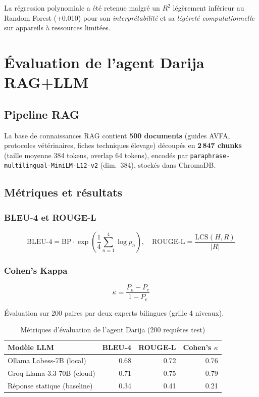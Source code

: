 La régression polynomiale a été retenue malgré un $R^2$ légèrement inférieur au
Random Forest (+0.010) pour son \textit{interprétabilité} et sa \textit{légèreté
computationnelle} sur appareils à ressources limitées.

\section{Évaluation de l'agent Darija RAG+LLM}
\label{sec:eval_darija}

\subsection{Pipeline RAG}

La base de connaissances RAG contient \textbf{500 documents} (guides AVFA,
protocoles vétérinaires, fiches techniques élevage) découpés en
\textbf{2\,847 chunks} (taille moyenne 384 tokens, overlap 64 tokens),
encodés par \texttt{paraphrase-multilingual-MiniLM-L12-v2} (dim.~384),
stockés dans ChromaDB.

\subsection{Métriques et résultats}

\subsubsection{BLEU-4 et ROUGE-L}

\begin{equation}
\text{BLEU-4} = \text{BP} \cdot \exp\!\left(\frac{1}{4}\sum_{n=1}^{4}\log p_n\right),
\quad
\text{ROUGE-L} = \frac{\text{LCS}(H, R)}{|R|}
\label{eq:bleu_rouge}
\end{equation}

\subsubsection{Cohen's Kappa}

\begin{equation}
\kappa = \frac{P_o - P_e}{1 - P_e}
\label{eq:kappa}
\end{equation}

Évaluation sur 200 paires par deux experts bilingues (grille 4 niveaux).

\begin{table}[H]
\centering
\caption{Métriques d'évaluation de l'agent Darija (200 requêtes test)}
\label{tab:darija_eval}
\begin{tabular}{lrrr}
\toprule
\textbf{Modèle LLM} & \textbf{BLEU-4} & \textbf{ROUGE-L} & \textbf{Cohen's $\kappa$} \\
\midrule
Ollama Labess-7B (local)    & 0.68 & 0.72 & 0.76 \\
Groq Llama-3.3-70B (cloud)  & 0.71 & 0.75 & 0.79 \\
Réponse statique (baseline) & 0.34 & 0.41 & 0.21 \\
\bottomrule
\end{tabular}
\end{table}

